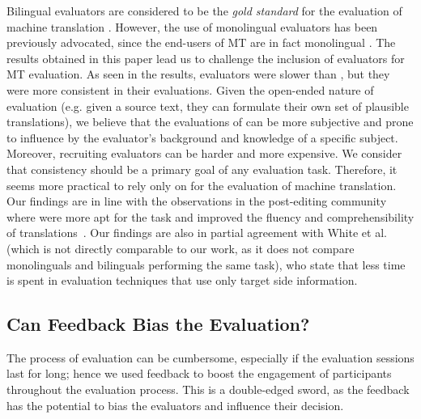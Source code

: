 Bilingual evaluators are considered to be the \emph{gold standard} for the evaluation of machine translation \cite{Dorr2011}. However, the use of monolingual evaluators has been previously advocated, since the end-users of MT are in fact monolingual \cite{Sanders2011}. The results obtained in this paper lead us to challenge the inclusion of \bil evaluators  for MT evaluation. %
As seen in the results, \mono evaluators were slower than \bils, but they were more consistent in their evaluations. %
Given the open-ended nature of \bil evaluation (e.g. given a source text, they can formulate their  own set of plausible translations), we believe that the evaluations of \bils can be more subjective and prone to influence by the evaluator's background and knowledge of a specific subject.  Moreover,
 recruiting \bil evaluators can be harder and more expensive. %
We consider that consistency should be a primary goal of any evaluation task. Therefore, it seems more practical to rely only on \monos for the evaluation of machine translation. Our findings are in line with the observations in the post-editing community where \monos were more apt for the task and improved the fluency and comprehensibility of translations~\cite{mitchell2013community}. Our findings are also in partial agreement with White et al.~ (which is not directly comparable to our work, as it does not compare monolinguals and bilinguals performing the same task), who state that less time is spent in evaluation techniques that use only target side information. 


\subsection{Can Feedback Bias the Evaluation?}\label{ss:disc_feedback}
The process of evaluation can be cumbersome, especially if the evaluation sessions last for long; hence we used feedback to boost the engagement of participants throughout the evaluation process. This is a double-edged sword, as the feedback has the potential to bias the evaluators and influence their decision. %
\pagebreak

